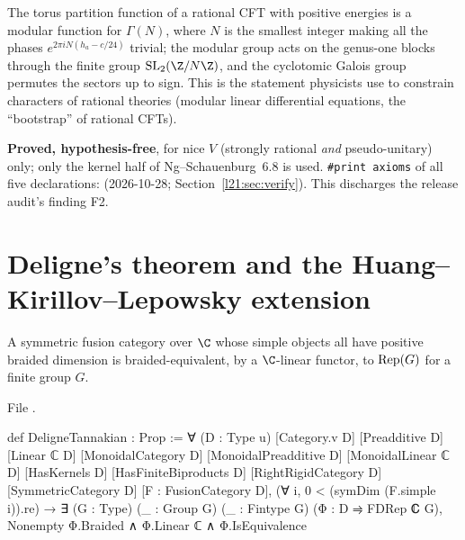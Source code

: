 \begin{physics}
The torus partition function of a rational CFT with positive energies is a modular function for $\Gamma(N)$, where $N$ is the
smallest integer making all the phases $e^{2\pi i N(h_a-c/24)}$ trivial; the modular group acts on the genus-one blocks
through the finite group $\ltwooneSL(\Z/N\Z)$, and the cyclotomic Galois group permutes the sectors up to sign. This is the
statement physicists use to constrain characters of rational theories (modular linear differential equations, the
``bootstrap'' of rational CFTs).
\end{physics}

\begin{status}
\textbf{Proved, hypothesis-free}, for nice $V$ (strongly rational \emph{and} pseudo-unitary) only; only the kernel half of
Ng--Schauenburg~6.8 is used. \texttt{\#print axioms} of all five declarations: 
(2026-10-28; Section~\ref{l21:sec:verify}). This discharges the release audit's finding F2.
\end{status}

\section{Deligne's theorem and the Huang--Kirillov--Lepowsky extension}\label{l21:sec:tannakian}

\begin{definition}\label{l21:def:deligne}
A symmetric fusion category over $\C$ whose simple objects all have positive braided dimension is braided-equivalent,
by a $\C$-linear functor, to $\operatorname{Rep}(G)$ for a finite group $G$.
\end{definition}
\noindent File .
\begin{leancode}
def DeligneTannakian : Prop :=
  ∀ (D : Type u) [Category.{v} D] [Preadditive D] [Linear ℂ D] [MonoidalCategory D]
    [MonoidalPreadditive D] [MonoidalLinear ℂ D] [HasKernels D] [HasFiniteBiproducts D]
    [RightRigidCategory D] [SymmetricCategory D] [F : FusionCategory D],
    (∀ i, 0 < (symDim (F.simple i)).re) →
    ∃ (G : Type) (_ : Group G) (_ : Fintype G) (Φ : D ⥤ FDRep ℂ G),
      Nonempty Φ.Braided ∧ Φ.Linear ℂ ∧ Φ.IsEquivalence
\end{leancode}

